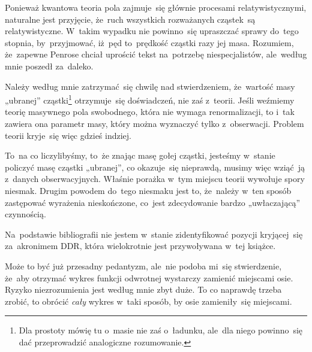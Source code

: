 \documentclass[a4paper,11pt]{article}
\begin{document}
\vspace{0em}


\noindent
{} Ponieważ kwantowa teoria pola zajmuje~się
głównie procesami relatywistycznymi, naturalne jest przyjęcie, że~ruch
wszystkich rozważanych cząstek~są relatywistyczne. W~takim wypadku nie
powinno~się upraszczać sprawy do~tego stopnia, by~przyjmować, iż~pęd
to~prędkość cząstki razy jej masa. Rozumiem, że~zapewne Penrose chciał
uprościć tekst na~potrzebę niespecjalistów, ale~według mnie poszedł
za~daleko.

\vspace{\spaceFour}





\noindent
{} Należy według mnie zatrzymać~się chwilę nad
stwierdzeniem, że~wartość masy „ubranej” cząstki\footnote{Dla
  prostoty mówię tu o~masie nie zaś o~ładunku, ale~dla niego
  powinno~się dać przeprowadzić analogiczne rozumowanie.}
otrzymuje~się doświadczeń, nie zaś z~teorii. Jeśli weźmiemy teorię
masywnego pola swobodnego, która nie wymaga renormalizacji, to i~tak
zawiera ona parametr masy, który można wyznaczyć tylko z~obserwacji.
Problem teorii kryje~się więc gdzieś indziej.

To~na co liczylibyśmy, to~że znając masę gołej cząstki, jesteśmy
w~stanie policzyć masę cząstki „ubranej”, co okazuje~się nieprawdą,
musimy więc wziąć~ją z~danych obserwacyjnych. Właśnie porażka w~tym
miejscu teorii wywołuje spory niesmak. Drugim powodem do~tego niesmaku
jest to, że~należy w~ten sposób zastępować wyrażenia nieskończone,
co~jest zdecydowanie bardzo „uwłaczającą” czynnością.

\vspace{\spaceFour}





\noindent
{} Na~podstawie bibliografii nie jestem w~stanie
zidentyfikować pozycji kryjącej~się za~akronimem DDR, która
wielokrotnie jest przywoływana w~tej książce.

\vspace{\spaceFour}





\noindent
{} Może to być już przesadny pedantyzm, ale~nie podoba
mi~się stwierdzenie, że~aby otrzymać wykres funkcji odwrotnej
wystarczy zamienić miejscami osie. Ryzyko niezrozumienia jest według
mnie zbyt duże. To co naprawdę trzeba zrobić, to obrócić \textit{cały}
wykres w~taki sposób, by osie zamieniły~się miejscami.
\end{document}
